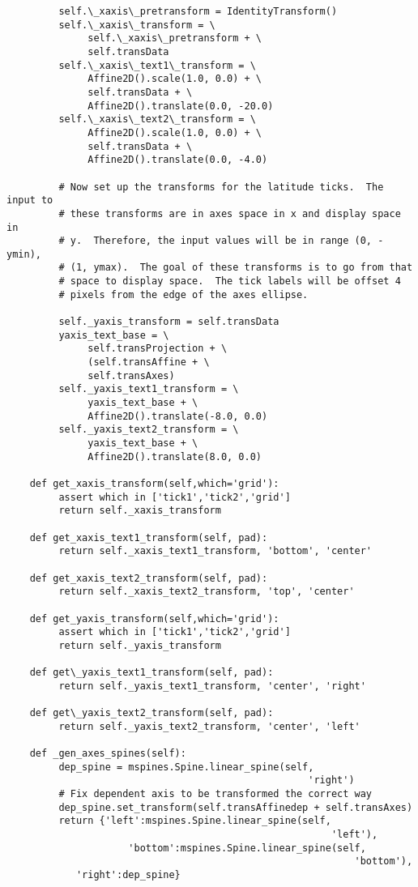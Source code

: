 {\begin{lstlisting}
         self.\_xaxis\_pretransform = IdentityTransform()
         self.\_xaxis\_transform = \
              self.\_xaxis\_pretransform + \
              self.transData
         self.\_xaxis\_text1\_transform = \
              Affine2D().scale(1.0, 0.0) + \
              self.transData + \
              Affine2D().translate(0.0, -20.0)
         self.\_xaxis\_text2\_transform = \
              Affine2D().scale(1.0, 0.0) + \
              self.transData + \
              Affine2D().translate(0.0, -4.0)

         # Now set up the transforms for the latitude ticks.  The input to
         # these transforms are in axes space in x and display space in
         # y.  Therefore, the input values will be in range (0, -ymin),
         # (1, ymax).  The goal of these transforms is to go from that
         # space to display space.  The tick labels will be offset 4
         # pixels from the edge of the axes ellipse.

         self._yaxis_transform = self.transData
         yaxis_text_base = \
              self.transProjection + \
              (self.transAffine + \
              self.transAxes)
         self._yaxis_text1_transform = \
              yaxis_text_base + \
              Affine2D().translate(-8.0, 0.0)
         self._yaxis_text2_transform = \
              yaxis_text_base + \
              Affine2D().translate(8.0, 0.0)

    def get_xaxis_transform(self,which='grid'):
         assert which in ['tick1','tick2','grid']
         return self._xaxis_transform

    def get_xaxis_text1_transform(self, pad):
         return self._xaxis_text1_transform, 'bottom', 'center'

    def get_xaxis_text2_transform(self, pad):
         return self._xaxis_text2_transform, 'top', 'center'

    def get_yaxis_transform(self,which='grid'):
         assert which in ['tick1','tick2','grid']
         return self._yaxis_transform

    def get\_yaxis_text1_transform(self, pad):
         return self._yaxis_text1_transform, 'center', 'right'

    def get\_yaxis_text2_transform(self, pad):
         return self._yaxis_text2_transform, 'center', 'left'

    def _gen_axes_spines(self):
         dep_spine = mspines.Spine.linear_spine(self,
                                                    'right')
         # Fix dependent axis to be transformed the correct way
         dep_spine.set_transform(self.transAffinedep + self.transAxes)
         return {'left':mspines.Spine.linear_spine(self,
                                                        'left'),
                     'bottom':mspines.Spine.linear_spine(self,
                                                            'bottom'),
            'right':dep_spine}


\end{lstlisting}}

